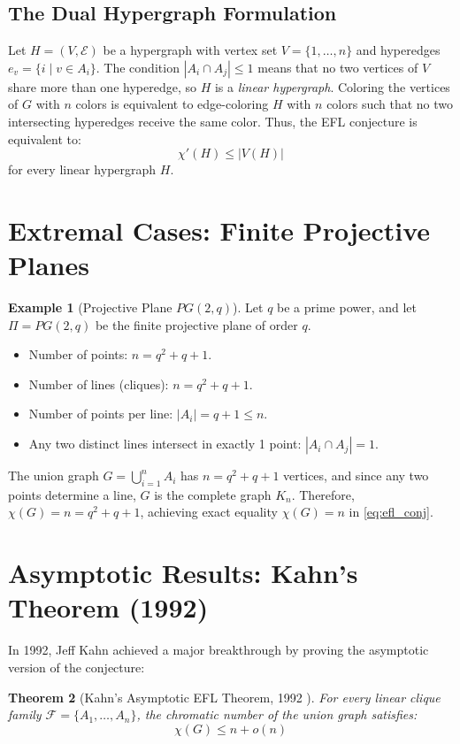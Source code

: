 \documentclass[11pt,a4paper]{article}
\newtheorem{theorem}{Theorem}[section]
\theoremstyle{definition}
\newtheorem{example}[theorem]{Example}
\begin{document}
\subsection{The Dual Hypergraph Formulation}
Let $H = (V, \mathcal{E})$ be a hypergraph with vertex set $V = \{1, \dots, n\}$ and hyperedges $e_v = \{ i \mid v \in A_i \}$.
The condition $|A_i \cap A_j| \le 1$ means that no two vertices of $V$ share more than one hyperedge, so $H$ is a \emph{linear hypergraph}.
Coloring the vertices of $G$ with $n$ colors is equivalent to edge-coloring $H$ with $n$ colors such that no two intersecting hyperedges receive the same color.
Thus, the EFL conjecture is equivalent to:
\[ \chi'(H) \le |V(H)| \]
for every linear hypergraph $H$.

\section{Extremal Cases: Finite Projective Planes}

\begin{example}[Projective Plane $PG(2, q)$]\label{ex:projective_plane}
Let $q$ be a prime power, and let $\Pi = PG(2, q)$ be the finite projective plane of order $q$.
\begin{itemize}
    \item Number of points: $n = q^2 + q + 1$.
    \item Number of lines (cliques): $n = q^2 + q + 1$.
    \item Number of points per line: $|A_i| = q + 1 \le n$.
    \item Any two distinct lines intersect in exactly 1 point: $|A_i \cap A_j| = 1$.
\end{itemize}
The union graph $G = \bigcup_{i=1}^n A_i$ has $n = q^2 + q + 1$ vertices, and since any two points determine a line, $G$ is the complete graph $K_n$.
Therefore, $\chi(G) = n = q^2 + q + 1$, achieving exact equality $\chi(G) = n$ in \eqref{eq:efl_conj}.
\end{example}

\section{Asymptotic Results: Kahn's Theorem (1992)}

In 1992, Jeff Kahn \cite{kahn1992} achieved a major breakthrough by proving the asymptotic version of the conjecture:

\begin{theorem}[Kahn's Asymptotic EFL Theorem, 1992 \cite{kahn1992}]\label{thm:kahn}
For every linear clique family $\mathcal{F} = \{A_1, \dots, A_n\}$, the chromatic number of the union graph satisfies:
\begin{equation}\label{eq:kahn_bound}
\chi(G) \le n + o(n)
\end{equation}
\end{theorem}
\end{document}
